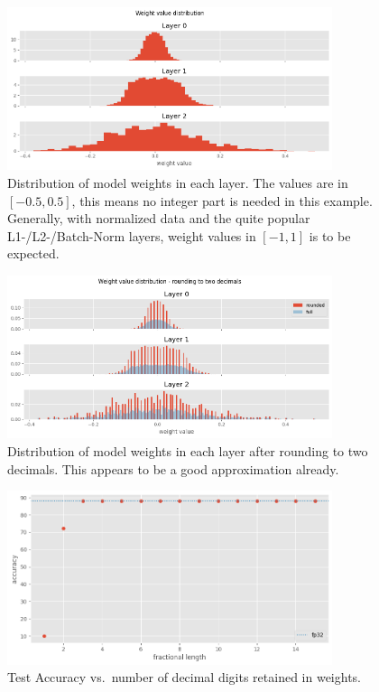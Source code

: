 \documentclass[11pt]{article}
\begin{document}
\begin{figure}[H]
	\centering
	\includegraphics[width=0.85\textwidth]{figures/118_dist.png}
	\caption{
		Distribution of model weights in each layer. The values are in $[-0.5, 0.5]$,
		this means no integer part is needed in this example. Generally, with normalized data
		and the quite popular L1-/L2-/Batch-Norm layers, weight values in $[-1, 1]$ is to be expected.}
\end{figure}

\begin{figure}[H]
	\centering
	\includegraphics[width=0.85\textwidth]{figures/118_dist2.png}
	\caption{Distribution of model weights in each layer after rounding to two decimals.
	This appears to be a good approximation already.}
	\label{fig:118_2}
\end{figure}

\begin{figure}[H]
	\centering
	\includegraphics[width=0.85\textwidth]{figures/118_accuracy.png}
	\caption{Test Accuracy vs.\ number of decimal digits retained in weights.}
	\label{fig:118_acc}
\end{figure}
\end{document}

